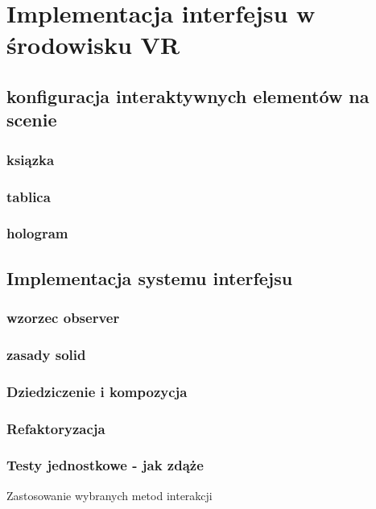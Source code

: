 \chapter{Implementacja interfejsu w środowisku VR}
\section{konfiguracja interaktywnych elementów na scenie}
\subsection {ksiązka}
\subsection{tablica}
\subsection{hologram}

\section{Implementacja systemu interfejsu}
\subsection{wzorzec observer}
\subsection{zasady solid}
\subsection{Dziedziczenie i kompozycja}
\subsection{Refaktoryzacja}
\subsection{Testy jednostkowe - jak zdąże}



Zastosowanie wybranych metod interakcji
